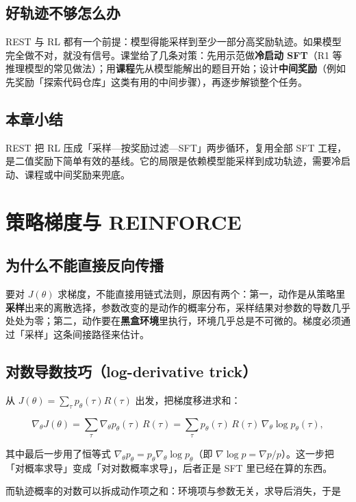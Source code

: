 \documentclass[a4paper]{article}
\begin{document}
\subsection{好轨迹不够怎么办}

REST 与 RL 都有一个前提：模型得能采样到至少一部分高奖励轨迹。如果模型完全做不对，就没有信号。课堂给了几条对策：先用示范做\textbf{冷启动 SFT}（R1 等推理模型的常见做法）；用\textbf{课程}先从模型能解出的题目开始；设计\textbf{中间奖励}（例如先奖励「探索代码仓库」这类有用的中间步骤），再逐步解锁整个任务。

\subsection{本章小结}
REST 把 RL 压成「采样—按奖励过滤—SFT」两步循环，复用全部 SFT 工程，是二值奖励下简单有效的基线。它的局限是依赖模型能采样到成功轨迹，需要冷启动、课程或中间奖励来兜底。

\section{策略梯度与 REINFORCE}

\subsection{为什么不能直接反向传播}

要对 $J(\theta)$ 求梯度，不能直接用链式法则，原因有两个：第一，动作是从策略里\textbf{采样}出来的离散选择，参数改变的是动作的概率分布，采样结果对参数的导数几乎处处为零；第二，动作要在\textbf{黑盒环境}里执行，环境几乎总是不可微的。梯度必须通过「采样」这条间接路径来估计。

\subsection{对数导数技巧（log-derivative trick）}

从 $J(\theta) = \sum_{\tau} p_\theta(\tau) R(\tau)$ 出发，把梯度移进求和：

$$
\nabla_\theta J(\theta) = \sum_{\tau} \nabla_\theta p_\theta(\tau)\, R(\tau)
= \sum_{\tau} p_\theta(\tau)\, R(\tau)\, \nabla_\theta \log p_\theta(\tau),
$$

其中最后一步用了恒等式 $\nabla_\theta p_\theta = p_\theta \nabla_\theta \log p_\theta$（即 $\nabla \log p = \nabla p / p$）。这一步把「对概率求导」变成「对对数概率求导」，后者正是 SFT 里已经在算的东西。

而轨迹概率的对数可以拆成动作项之和：环境项与参数无关，求导后消失，于是
\end{document}
